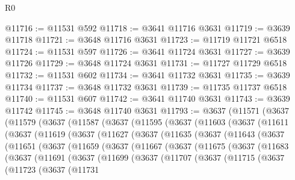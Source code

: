 \begin{lexlean}{R0}
\begin{coremodule}
@11716 := @11531 @592
@11718 := @3641 @11716 @3631
@11719 := @3639 @11718
@11721 := @3648 @11716 @3631
@11723 := @11719 @11721 @6518
@11724 := @11531 @597
@11726 := @3641 @11724 @3631
@11727 := @3639 @11726
@11729 := @3648 @11724 @3631
@11731 := @11727 @11729 @6518
@11732 := @11531 @602
@11734 := @3641 @11732 @3631
@11735 := @3639 @11734
@11737 := @3648 @11732 @3631
@11739 := @11735 @11737 @6518
@11740 := @11531 @607
@11742 := @3641 @11740 @3631
@11743 := @3639 @11742
@11745 := @3648 @11740 @3631
@11793 := @3637
    (@11571
      (@3637
        (@11579
          (@3637
            (@11587
              (@3637
                (@11595
                  (@3637
                    (@11603
                      (@3637
                        (@11611
                          (@3637
                            (@11619
                              (@3637
                                (@11627
                                  (@3637
                                    (@11635
                                      (@3637
                                        (@11643
                                          (@3637
                                            (@11651
                                              (@3637
                                                (@11659
                                                  (@3637
                                                    (@11667
                                                      (@3637
                                                        (@11675
                                                          (@3637
                                                            (@11683
                                                              (@3637
                                                                (@11691
                                                                  (@3637
                                                                    (@11699
                                                                      (@3637
                                                                        (@11707
                                                                          (@3637
                                                                            (@11715
                                                                              (@3637
                                                                                (@11723
                                                                                  (@3637
                                                                                    (@11731

\end{coremodule}
\end{lexlean}
